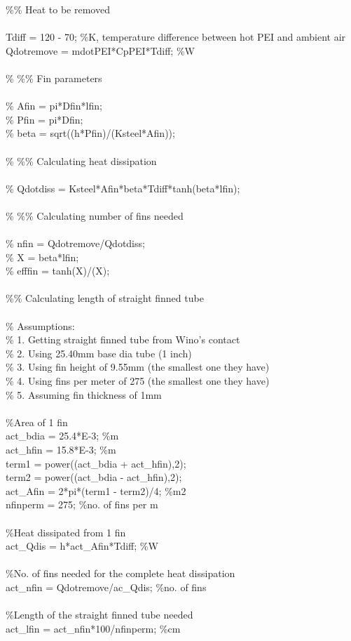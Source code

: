 \begin{appendices}
{\%\% Heat to be removed \\
\\
Tdiff = 120 - 70; \%K, temperature difference between hot PEI and ambient air \\
Qdotremove = mdotPEI*CpPEI*Tdiff; \%W \\
\\
\% \%\% Fin parameters \\
\\
\% Afin = pi*Dfin*lfin; \\
\% Pfin = pi*Dfin; \\
\% beta = sqrt((h*Pfin)/(Ksteel*Afin)); \\
\\
\% \%\% Calculating heat dissipation \\
\\
\% Qdotdiss = Ksteel*Afin*beta*Tdiff*tanh(beta*lfin); \\
\\ 
\% \%\% Calculating number of fins needed \\
\\
\% nfin = Qdotremove/Qdotdiss; \\
\% X = beta*lfin; \\
\% efffin = tanh(X)/(X); \\
\\
\%\% Calculating length of straight finned tube \\
\\
\% Assumptions: \\
\% 1. Getting straight finned tube from Wino's contact \\
\% 2. Using 25.40mm base dia tube (1 inch) \\
\% 3. Using fin height of 9.55mm (the smallest one they have) \\
\% 4. Using fins per meter of 275 (the smallest one they have) \\
\% 5. Assuming fin thickness of 1mm \\
\\ 
\%Area of 1 fin \\
act\_bdia = 25.4*E-3; \%m \\
act\_hfin = 15.8*E-3; \%m \\
term1 = power((act\_bdia + act\_hfin),2); \\
term2 = power((act\_bdia - act\_hfin),2); \\
act\_Afin = 2*pi*(term1 - term2)/4; \%m2 \\
nfinperm = 275; \%no. of fins per m \\
\\
\%Heat dissipated from 1 fin \\
act\_Qdis = h*act\_Afin*Tdiff; \%W \\
\\
\%No. of fins needed for the complete heat dissipation \\
act\_nfin = Qdotremove/ac\_Qdis; \%no. of fins \\
\\
\%Length of the straight finned tube needed \\
act\_lfin = act\_nfin*100/nfinperm; \%cm \\
}





\end{appendices}
